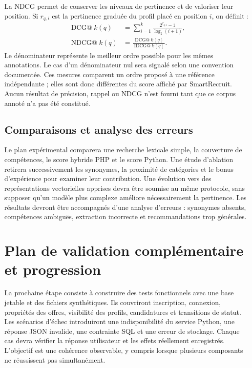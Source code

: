 La NDCG permet de conserver les niveaux de pertinence et de valoriser leur position. Si $r_{q,i}$ est la pertinence graduée du profil placé en position $i$, on définit :
\begin{align}
\operatorname{DCG@}k(q) &= \sum_{i=1}^{k}\frac{2^{r_{q,i}}-1}{\log_2(i+1)}, \\
\operatorname{NDCG@}k(q) &= \frac{\operatorname{DCG@}k(q)}{\operatorname{IDCG@}k(q)}.
\end{align}
Le dénominateur représente le meilleur ordre possible pour les mêmes annotations. Le cas d'un dénominateur nul sera signalé selon une convention documentée. Ces mesures comparent un ordre proposé à une référence indépendante ; elles sont donc différentes du score affiché par SmartRecruit. Aucun résultat de précision, rappel ou NDCG n'est fourni tant que ce corpus annoté n'a pas été constitué.

\subsection{Comparaisons et analyse des erreurs}

Le plan expérimental comparera une recherche lexicale simple, la couverture de compétences, le score hybride PHP et le score Python. Une étude d'ablation retirera successivement les synonymes, la proximité de catégories et le bonus d'expérience pour examiner leur contribution. Une évolution vers des représentations vectorielles apprises devra être soumise au même protocole, sans supposer qu'un modèle plus complexe améliore nécessairement la pertinence. Les résultats devront être accompagnés d'une analyse d'erreurs : synonymes absents, compétences ambiguës, extraction incorrecte et recommandations trop générales.

\section{Plan de validation complémentaire et progression}

La prochaine étape consiste à construire des tests fonctionnels avec une base jetable et des fichiers synthétiques. Ils couvriront inscription, connexion, propriétés des offres, visibilité des profils, candidatures et transitions de statut. Les scénarios d'échec introduiront une indisponibilité du service Python, une réponse JSON invalide, une contrainte SQL et une erreur de stockage. Chaque cas devra vérifier la réponse utilisateur et les effets réellement enregistrés. L'objectif est une cohérence observable, y compris lorsque plusieurs composants ne réussissent pas simultanément.

